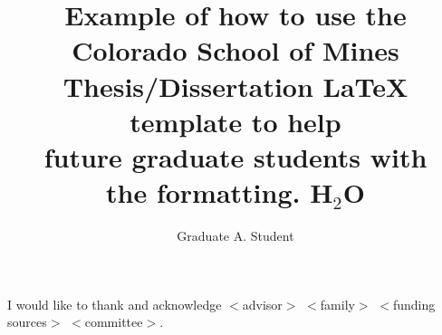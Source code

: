 \documentclass[letterpaper,10pt]{article} %
\title{
    Example of how to use the Colorado School of Mines\\
    Thesis/Dissertation \LaTeX{} template to help\\
    future graduate students with\\
    the formatting. \texorpdfstring{H$_2$O}{Water}
    }
\author{Graduate A. Student}        %
\begin{document}

\frontmatter                       %
\maketitle\newpage                 %
\makecopyright{\the\year}\newpage  %
\makesubmittal\newpage             %

\begin{abstract}
    
\end{abstract} \newpage


\tableofcontents\newpage        %
\listoffigures\newpage          %
\listoftables\newpage           %

\listofsymbols*                         %
\newpage

\listofabbreviations*                  %
\newpage



\begin{acknowledgments}
    I would like to thank and acknowledge $<$advisor$>$ $<$family$>$ $<$funding sources$>$ $<$committee$>$.
\end{acknowledgments} \newpage
\end{document}
